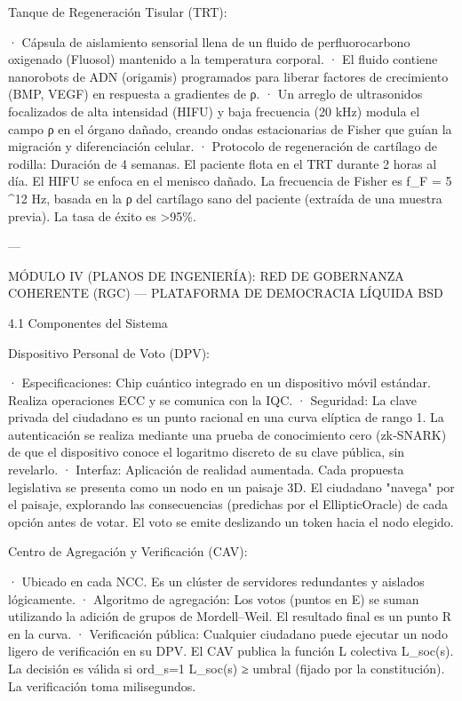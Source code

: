 \documentclass[12pt,twoside]{book}
\begin{document}
Tanque de Regeneración Tisular (TRT):

· Cápsula de aislamiento sensorial llena de un fluido de perfluorocarbono oxigenado (Fluosol) mantenido a la temperatura corporal.
· El fluido contiene nanorobots de ADN (origamis) programados para liberar factores de crecimiento (BMP, VEGF) en respuesta a gradientes de ρ.
· Un arreglo de ultrasonidos focalizados de alta intensidad (HIFU) y baja frecuencia (20 kHz) modula el campo ρ en el órgano dañado, creando ondas estacionarias de Fisher que guían la migración y diferenciación celular.
· Protocolo de regeneración de cartílago de rodilla: Duración de 4 semanas. El paciente flota en el TRT durante 2 horas al día. El HIFU se enfoca en el menisco dañado. La frecuencia de Fisher es  f_F = 5 ^{12}  Hz, basada en la ρ del cartílago sano del paciente (extraída de una muestra previa). La tasa de éxito es >95\%.

---

MÓDULO IV (PLANOS DE INGENIERÍA): RED DE GOBERNANZA COHERENTE (RGC) — PLATAFORMA DE DEMOCRACIA LÍQUIDA BSD

4.1 Componentes del Sistema

Dispositivo Personal de Voto (DPV):

· Especificaciones: Chip cuántico integrado en un dispositivo móvil estándar. Realiza operaciones ECC y se comunica con la IQC.
· Seguridad: La clave privada del ciudadano es un punto racional en una curva elíptica de rango 1. La autenticación se realiza mediante una prueba de conocimiento cero (zk‑SNARK) de que el dispositivo conoce el logaritmo discreto de su clave pública, sin revelarlo.
· Interfaz: Aplicación de realidad aumentada. Cada propuesta legislativa se presenta como un nodo en un paisaje 3D. El ciudadano "navega" por el paisaje, explorando las consecuencias (predichas por el EllipticOracle) de cada opción antes de votar. El voto se emite deslizando un token hacia el nodo elegido.

Centro de Agregación y Verificación (CAV):

· Ubicado en cada NCC. Es un clúster de servidores redundantes y aislados lógicamente.
· Algoritmo de agregación: Los votos (puntos en E) se suman utilizando la adición de grupos de Mordell–Weil. El resultado final es un punto R en la curva.
· Verificación pública: Cualquier ciudadano puede ejecutar un nodo ligero de verificación en su DPV. El CAV publica la función L colectiva L_soc(s). La decisión es válida si ord_{s=1} L_soc(s) ≥ umbral (fijado por la constitución). La verificación toma milisegundos.
\end{document}

